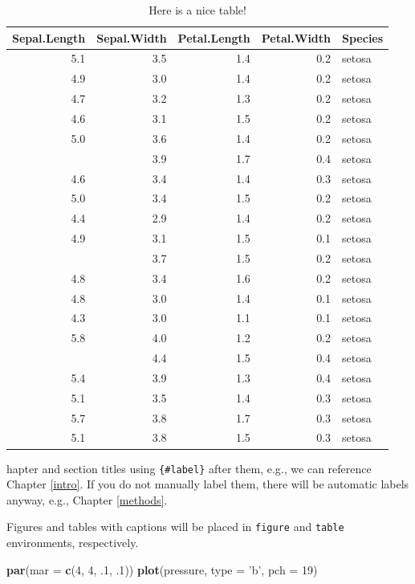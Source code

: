 \documentclass[
]{book}
\newenvironment{Shaded}{\begin{snugshade}}{\end{snugshade}}
\newcommand{\DataTypeTok}[1]{\textcolor[rgb]{0.13,0.29,0.53}{#1}}
\newcommand{\DecValTok}[1]{\textcolor[rgb]{0.00,0.00,0.81}{#1}}
\newcommand{\FloatTok}[1]{\textcolor[rgb]{0.00,0.00,0.81}{#1}}
\newcommand{\KeywordTok}[1]{\textcolor[rgb]{0.13,0.29,0.53}{\textbf{#1}}}
\newcommand{\NormalTok}[1]{#1}
\newcommand{\StringTok}[1]{\textcolor[rgb]{0.31,0.60,0.02}{#1}}
\begin{document}
\begin{table}

\caption{\label{tab:nice-tab}Here is a nice table!}
\centering
\begin{tabular}[t]{rrrrl}
\toprule
Sepal.Length & Sepal.Width & Petal.Length & Petal.Width & Species\\
\midrule
5.1 & 3.5 & 1.4 & 0.2 & setosa\\
4.9 & 3.0 & 1.4 & 0.2 & setosa\\
4.7 & 3.2 & 1.3 & 0.2 & setosa\\
4.6 & 3.1 & 1.5 & 0.2 & setosa\\
5.0 & 3.6 & 1.4 & 0.2 & setosa\\
\addlinespace
5.4 & 3.9 & 1.7 & 0.4 & setosa\\
4.6 & 3.4 & 1.4 & 0.3 & setosa\\
5.0 & 3.4 & 1.5 & 0.2 & setosa\\
4.4 & 2.9 & 1.4 & 0.2 & setosa\\
4.9 & 3.1 & 1.5 & 0.1 & setosa\\
\addlinespace
5.4 & 3.7 & 1.5 & 0.2 & setosa\\
4.8 & 3.4 & 1.6 & 0.2 & setosa\\
4.8 & 3.0 & 1.4 & 0.1 & setosa\\
4.3 & 3.0 & 1.1 & 0.1 & setosa\\
5.8 & 4.0 & 1.2 & 0.2 & setosa\\
\addlinespace
5.7 & 4.4 & 1.5 & 0.4 & setosa\\
5.4 & 3.9 & 1.3 & 0.4 & setosa\\
5.1 & 3.5 & 1.4 & 0.3 & setosa\\
5.7 & 3.8 & 1.7 & 0.3 & setosa\\
5.1 & 3.8 & 1.5 & 0.3 & setosa\\
\bottomrule
\end{tabular}
\end{table}

hapter and section titles using \texttt{\{\#label\}} after them, e.g., we can reference Chapter \ref{intro}. If you do not manually label them, there will be automatic labels anyway, e.g., Chapter \ref{methods}.

Figures and tables with captions will be placed in \texttt{figure} and \texttt{table} environments, respectively.

\begin{Shaded}
\begin{Highlighting}[]
\KeywordTok{par}\NormalTok{(}\DataTypeTok{mar =} \KeywordTok{c}\NormalTok{(}\DecValTok{4}\NormalTok{, }\DecValTok{4}\NormalTok{, }\FloatTok{.1}\NormalTok{, }\FloatTok{.1}\NormalTok{))}
\KeywordTok{plot}\NormalTok{(pressure, }\DataTypeTok{type =} \StringTok{'b'}\NormalTok{, }\DataTypeTok{pch =} \DecValTok{19}\NormalTok{)}
\end{Highlighting}
\end{Shaded}
\end{document}
